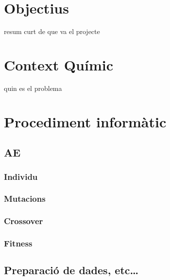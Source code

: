 \section{Objectius} %
	\label{sec:Objectius}
	resum curt de que va el projecte
\section{Context Químic} %
	\label{sec:Context Quimic}
	quin es el problema 
\section{Procediment informàtic} %
	\label{sec:Procediment informatic}
\subsection{AE} %
	\label{sub:AE}
\subsubsection{Individu} %
	\label{ssub:Individu}
\subsubsection{Mutacions} %
	\label{ssub:Mutacions}
\subsubsection{Crossover} %
	\label{ssub:Crossover}
\subsubsection{Fitness} %
	\label{ssub:Fitness}
\subsection{Preparació de dades, etc\ldots} %
	\label{sub:Preparacio de dades, etc}

